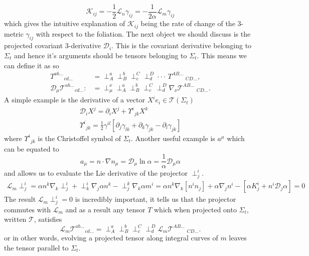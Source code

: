 \documentclass[11pt, oneside]{report}  %
\newcommand{\D}{\mathcal{D}}
\newcommand{\K}{\mathcal{K}}
\renewcommand{\L}{\mathcal{L}}
\newcommand{\T}{\mathcal{T}}
\numberwithin{equation}{section}
\begin{document}
\begin{equation} \K_{ij} = -\frac{1}{2}\L_n \gamma_{ij} = -\frac{1}{2\alpha}\L_m \gamma_{ij}\end{equation}
which gives the intuitive explanation of $\K_{ij}$ being the rate of change of the 3-metric $\gamma_{ij}$ with respect to the foliation. 
The next object we should discuss is the projected covariant 3-derivative $\D_i$. This is the covariant derivative belonging to $\Sigma_t$ and hence it's arguments should be tensors belonging to $\Sigma_t$. This means we can define it as so
\begin{align} {{T}}^{ab ...}_{\;\;\;\;\;\;\;cd ...} &=  \perp^{a}_{A}\perp^{b}_{B}\perp^{C}_{c}\perp^{D}_{d}\cdot\cdot\cdot\, T^{AB ...}_{\;\;\;\;\;\;\;\;\;\;CD ...},\\
  \D_\mu {{\mathcal{T}}}^{ab ...}_{\;\;\;\;\;\;\;cd ...} :&=   \perp^\nu_\mu  \perp^{a}_{A}\perp^{b}_{B}\perp^{C}_{c}\perp^{D}_{d} \nabla_\nu{\mathcal{T}}^{AB ...}_{\;\;\;\;\;\;\;\;\;\;CD ...}.\end{align}
A simple example is the derivative of a vector $X^i e_i \in \T(\Sigma_t)$
\begin{gather} \D_i X^j = \partial_i X^j + \Upsilon^i_{\;\,jk}X^k\nonumber\\
\Upsilon^i_{\;\,jk} = \frac{1}{2}\gamma^{il}\left[ \partial_{j}\gamma_{lk} + \partial_{k}\gamma_{jk} -\partial_{l}\gamma_{jk} \right]\end{gather}
where $\Upsilon^i_{\;\,jk}$ is the Christoffel symbol of $\Sigma_t$. Another useful example is $a^\mu$ which can be equated to
\begin{equation} a_\mu = n\cdot \nabla n_\mu = \D_\mu \ln \alpha = \frac{1}{\alpha}\D_\mu \alpha\end{equation}
and allows us to evaluate the Lie derivative of the projector $\perp^i_j$.
\begin{gather*}\L_m \perp^i_j = \alpha n^k \nabla_k \perp^i_j + \perp^i_k \nabla_j \alpha n^k - \perp^k_j \nabla_k \alpha m^i  = \alpha n^k \nabla_k \left[ n^i n_j\right]  + \alpha \nabla_j n^i - \left[ \alpha K_j^i + n^i \D_j \alpha\right] = 0\end{gather*}
The result $\L_m \perp^i_j=0$ is incredibly important, it tells us that the projector commutes with $\L_m$ and as a result any tensor $T$ which when projected onto $\Sigma_t$, written $\T$, satisfies
\begin{equation}  \L_m {{\mathcal{T}}}^{ab ...}_{\;\;\;\;\;\;\;cd ...} =   \perp^{a}_{A}\perp^{b}_{B}\perp^{C}_{c}\perp^{D}_{d}\L_m{\mathcal{T}}^{AB ...}_{\;\;\;\;\;\;\;\;\;\;CD ...}.\end{equation} 
or in other words, evolving a projected tensor along integral curves of $m$ leaves the tensor parallel to $\Sigma_t$.
\end{document}
